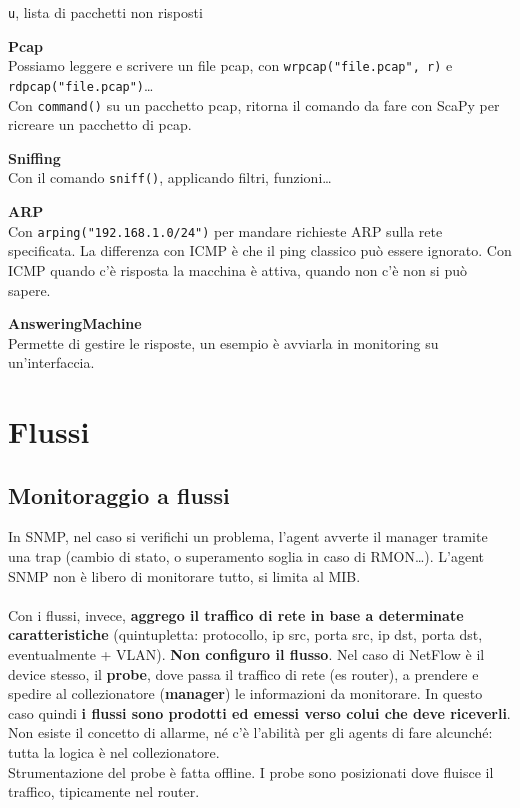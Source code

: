 \documentclass[10pt]{book}
\begin{document}
\begin{list}{}{}
\begin{list}{}{}
		\item \texttt{u}, lista di pacchetti non risposti
	\end{list}
	\item \textbf{Pcap}\\
	Possiamo leggere e scrivere un file pcap, con \texttt{wrpcap("file.pcap", r)} e \texttt{rdpcap("file.pcap")}\ldots\\
	Con \texttt{command()} su un pacchetto pcap, ritorna il comando da fare con ScaPy per ricreare un pacchetto di pcap.
	\item \textbf{Sniffing}\\
	Con il comando \texttt{sniff()}, applicando filtri, funzioni\ldots\\
	\item \textbf{ARP}\\
	Con \texttt{arping("192.168.1.0/24")} per mandare richieste ARP sulla rete specificata. La differenza con ICMP è che il ping classico può essere ignorato. Con ICMP quando c'è risposta la macchina è attiva, quando non c'è non si può sapere.
	\item \textbf{AnsweringMachine}\\
	Permette di gestire le risposte, un esempio è avviarla in monitoring su un'interfaccia. 
\end{list}
\chapter{Flussi}
\section{Monitoraggio a flussi}
In SNMP, nel caso si verifichi un problema, l'agent avverte il manager tramite una trap (cambio di stato, o superamento soglia in caso di RMON\ldots). L'agent SNMP non è libero di monitorare tutto, si limita al MIB.\\\\
Con i flussi, invece, \textbf{aggrego il traffico di rete in base a determinate caratteristiche} (quintupletta: protocollo, ip src, porta src, ip dst, porta dst, eventualmente + VLAN). \textbf{Non configuro il flusso}. Nel caso di NetFlow è il device stesso, il \textbf{probe}, dove passa il traffico di rete (es router), a prendere e spedire al collezionatore (\textbf{manager}) le informazioni da monitorare. In questo caso quindi \textbf{i flussi sono prodotti ed emessi verso colui che deve riceverli}.\\
Non esiste il concetto di allarme, né c'è l'abilità per gli agents di fare alcunché: tutta la logica è nel collezionatore.\\
Strumentazione del probe è fatta offline. I probe sono posizionati dove fluisce il traffico, tipicamente nel router.
\end{document}
